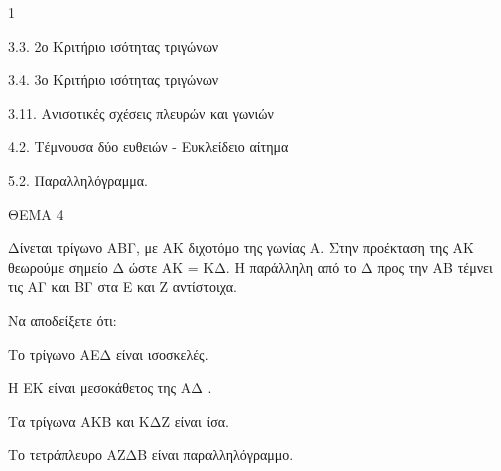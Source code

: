 \begin{ylh}{1}
    \item 3.3. 2ο Κριτήριο ισότητας τριγώνων
    \item 3.4. 3ο Κριτήριο ισότητας τριγώνων
    \item 3.11. Ανισοτικές σχέσεις πλευρών και γωνιών
    \item 4.2. Τέμνουσα δύο ευθειών - Ευκλείδειο αίτημα
    \item 5.2. Παραλληλόγραμμα.
\end{ylh}

ΘΕΜΑ 4

Δίνεται τρίγωνο ΑΒΓ, με ΑΚ διχοτόμο της γωνίας Α. Στην προέκταση της ΑΚ θεωρούμε σημείο Δ ώστε ΑΚ = ΚΔ. Η παράλληλη από το Δ προς την ΑΒ τέμνει τις ΑΓ και ΒΓ στα Ε και Ζ αντίστοιχα.

Να αποδείξετε ότι:

\begin{alist}
\item Το τρίγωνο ΑΕΔ είναι ισοσκελές. 

\item Η ΕΚ είναι μεσοκάθετος της ΑΔ . 

\item Τα τρίγωνα ΑΚΒ και ΚΔΖ είναι ίσα. 

\item Το τετράπλευρο ΑΖΔΒ είναι παραλληλόγραμμο. 


\end{alist}
